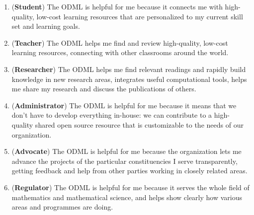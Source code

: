 \documentclass{article}
\begin{document}
\begin{enumerate}
\renewcommand{\theenumi}{\Roman{enumi}}
\item(\textbf{Student})
The ODML is helpful for me because it connects me with high-quality, low-cost learning resources that are personalized to my current skill set and learning goals.\label{student}
\item(\textbf{Teacher})
The ODML helps me find and review high-quality, low-cost learning resources, connecting with other classrooms around the world.\label{teacher}
\item(\textbf{Researcher})
The ODML helps me find relevant readings and rapidly build knowledge in new research areas, integrates useful computational tools, helps me share my research and discuss the publications of others.\label{researcher} 
\item(\textbf{Administrator})
The ODML is helpful for me because it means that we don't have to develop everything in-house: we can contribute to a high-quality shared open source resource that is customizable to the needs of our organization.\label{administrator} 
\item(\textbf{Advocate})
The ODML is helpful for me because the organization lets me advance the projects of the particular constituencies I serve transparently, getting feedback and help from other parties working in closely related areas.\label{advocate}
\item(\textbf{Regulator})
The ODML is helpful for me because it serves the whole field of mathematics and mathematical science, and helps show clearly how various areas and programmes are doing.\label{regulator}
\end{enumerate}
\end{document}
